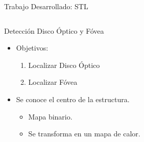 \documentclass[xcolor=dvipsnames,table]{beamer}
\begin{document}
\begin{frame}{Trabajo Desarrollado: STL}
	\begin{columns}[T]

		
		\begin{block}{Detección Disco Óptico y Fóvea}
			\begin{itemize}
				\item Objetivos:
				\begin{enumerate}
					\item Localizar Disco Óptico
					\item Localizar Fóvea
				\end{enumerate}
				\item Se conoce el centro de la estructura.
						\begin{itemize}
							\item Mapa binario.
							\item Se transforma en un mapa de calor.
						\end{itemize}


\end{itemize}
\end{block}
\end{columns}
\end{frame}
\end{document}
